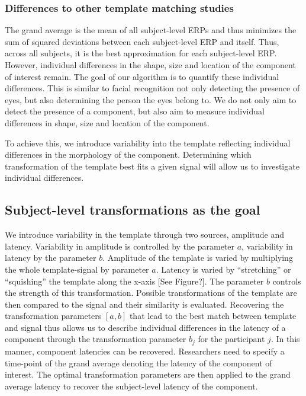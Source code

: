 \documentclass[
  man,floatsintext]{apa7}
\begin{document}
\hypertarget{differences-to-other-template-matching-studies}{%
\subsubsection{Differences to other template matching studies}\label{differences-to-other-template-matching-studies}}

The grand average is the mean of all subject-level ERPs and thus minimizes the sum of squared deviations between each subject-level ERP and itself. Thus, across all subjects, it is the best approximation for each subject-level ERP. However, individual differences in the shape, size and location of the component of interest remain. The goal of our algorithm is to quantify these individual differences. This is similar to facial recognition not only detecting the presence of eyes, but also determining the person the eyes belong to. We do not only aim to detect the presence of a component, but also aim to measure individual differences in shape, size and location of the component.

To achieve this, we introduce variability into the template reflecting individual differences in the morphology of the component. Determining which transformation of the template best fits a given signal will allow us to investigate individual differences.

\hypertarget{subject-level-transformations-as-the-goal}{%
\subsection{Subject-level transformations as the goal}\label{subject-level-transformations-as-the-goal}}

We introduce variability in the template through two sources, amplitude and latency. Variability in amplitude is controlled by the parameter \(a\), variability in latency by the parameter \(b\). Amplitude of the template is varied by multiplying the whole template-signal by parameter \(a\). Latency is varied by ``stretching'' or ``squishing'' the template along the x-axis {[}See Figure?{]}. The parameter \(b\) controls the strength of this transformation. Possible transformations of the template are then compared to the signal and their similarity is evaluated. Recovering the transformation parameters \([a, b]\) that lead to the best match between template and signal thus allows us to describe individual differences in the latency of a component through the transformation parameter \(b_j\) for the participant \(j\). In this manner, component latencies can be recovered. Researchers need to specify a time-point of the grand average denoting the latency of the component of interest. The optimal transformation parameters are then applied to the grand average latency to recover the subject-level latency of the component.
\end{document}

